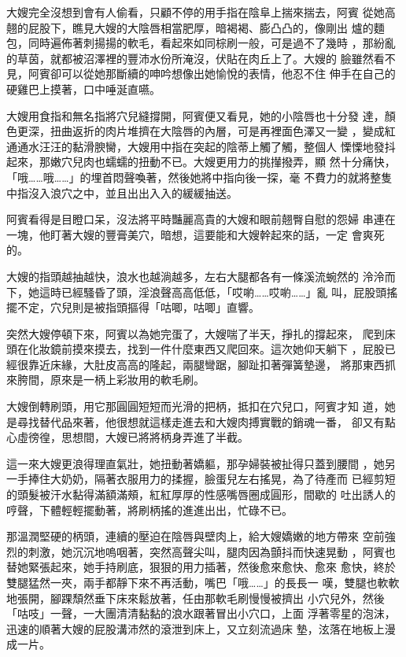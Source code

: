 大嫂完全沒想到會有人偷看，只顧不停的用手指在陰阜上揣來揣去，阿賓
從她高翹的屁股下，瞧見大嫂的大陰唇相當肥厚，暗褐褐、膨凸凸的，像剛出
爐的麵包，同時遍佈著刺揚揚的軟毛，看起來如同棕刷一般，可是過不了幾時
，那紛亂的草茵，就都被沼澤裡的豐沛水份所淹沒，伏貼在肉丘上了。大嫂的
臉雖然看不見，阿賓卻可以從她那斷續的呻吟想像出她愉悅的表情，他忍不住
伸手在自己的硬雞巴上摸著，口中唾涎直嚥。

大嫂用食指和無名指將穴兒縫撐開，阿賓便又看見，她的小陰唇也十分發
達，顏色更深，扭曲返折的肉片堆擠在大陰唇的內層，可是再裡面色澤又一變
，變成紅通通水汪汪的黏滑腴臠，大嫂用中指在突起的陰蒂上觸了觸，整個人
慄慄地發抖起來，那嫩穴兒肉也蠕蠕的扭動不已。大嫂更用力的挑攆撥弄，顯
然十分痛快，「哦……哦……」的埋首悶聲喚著，然後她將中指向後一探，毫
不費力的就將整隻中指沒入浪穴之中，並且出出入入的緩緩抽送。

阿賓看得是目瞪口呆，沒法將平時豔麗高貴的大嫂和眼前翹臀自慰的怨婦
串連在一塊，他盯著大嫂的豐膏美穴，暗想，這要能和大嫂幹起來的話，一定
會爽死的。

大嫂的指頭越抽越快，浪水也越淌越多，左右大腿都各有一條溪流蜿然的
泠泠而下，她這時已經騷昏了頭，淫浪聲高高低低，「哎喲……哎喲……」亂
叫，屁股頭搖擺不定，穴兒則是被指頭摳得「咕唧，咕唧」直響。

突然大嫂停頓下來，阿賓以為她完蛋了，大嫂喘了半天，掙扎的撐起來，
爬到床頭在化妝鏡前摸來摸去，找到一件什麼東西又爬回來。這次她仰天躺下
，屁股已經很靠近床緣，大肚皮高高的隆起，兩腿彎踞，腳趾扣著彈簧墊邊，
將那東西抓來胯間，原來是一柄上彩妝用的軟毛刷。

大嫂倒轉刷頭，用它那圓圓短短而光滑的把柄，抵扣在穴兒口，阿賓才知
道，她是尋找替代品來著，他很想就這樣走進去和大嫂肉搏實戰的銷魂一番，
卻又有點心虛徬徨，思想間，大嫂已將將柄身弄進了半截。

這一來大嫂更浪得理直氣壯，她扭動著嬌軀，那孕婦裝被扯得只蓋到腰間
，她另一手捧住大奶奶，隔著衣服用力的揉握，臉蛋兒左右搖晃，為了待產而
已經剪短的頭髮被汗水黏得滿額滿頰，紅紅厚厚的性感嘴唇圈成圓形，間歇的
吐出誘人的哼聲，下體輕輕擺動著，將刷柄搖的進進出出，忙碌不已。

那溫潤堅硬的柄頭，連續的壓迫在陰唇與壁肉上，給大嫂嬌嫩的地方帶來
空前強烈的刺激，她沉沉地嗚咽著，突然高聲尖叫，腿肉因為顫抖而快速晃動
，阿賓也替她緊張起來，她手持刷底，狠狠的用力插著，然後愈來愈快、愈來
愈快，終於雙腿猛然一夾，兩手都靜下來不再活動，嘴巴「哦……」的長長一
嘆，雙腿也軟軟地張開，腳踝頹然垂下床來鬆放著，任由那軟毛刷慢慢被擠出
小穴兒外，然後「咕吱」一聲，一大團清清黏黏的浪水跟著冒出小穴口，上面
浮著零星的泡沫，迅速的順著大嫂的屁股溝沛然的滾泄到床上，又立刻流過床
墊，泫落在地板上漫成一片。

